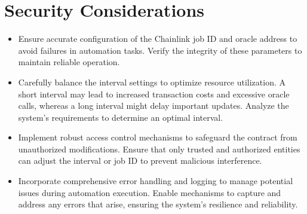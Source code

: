 \documentclass[letterpaper,10pt,english]{sphinxmanual}
\begin{document}
\section{Security Considerations}
\label{\detokenize{docs_chainlink_automation_contract:security-considerations}}\begin{itemize}
\item {} 
\sphinxAtStartPar
{}
Ensure accurate configuration of the Chainlink job ID and oracle address to avoid failures in automation tasks. Verify the integrity of these parameters to maintain reliable operation.

\item {} 
\sphinxAtStartPar
{}
Carefully balance the interval settings to optimize resource utilization. A short interval may lead to increased transaction costs and excessive oracle calls, whereas a long interval might delay important updates. Analyze the system’s requirements to determine an optimal interval.

\item {} 
\sphinxAtStartPar
{}
Implement robust access control mechanisms to safeguard the contract from unauthorized modifications. Ensure that only trusted and authorized entities can adjust the interval or job ID to prevent malicious interference.

\item {} 
\sphinxAtStartPar
{}
Incorporate comprehensive error handling and logging to manage potential issues during automation execution. Enable mechanisms to capture and address any errors that arise, ensuring the system’s resilience and reliability.

\end{itemize}
\end{document}
